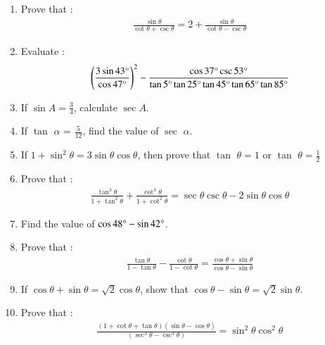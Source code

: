 \begin{enumerate}[label=\thesubsection.\arabic*.,ref=\thesubsection.\theenumi]
\hfill{}\item Prove that :
\begin{align*}
    \frac{\sin \theta}{\cot \theta + \csc \theta} = 2 + \frac{\sin \theta}{\cot \theta - \csc \theta}
\end{align*}

\hfill{}\item Evaluate :
\begin{align*}
\left(\frac{3\sin 43\degree}{\cos 47\degree}\right)^2 - \frac{\cos 37\degree \csc 53\degree}{\tan 5\degree \tan 25\degree \tan 45\degree \tan 65\degree \tan 85\degree}
\end{align*}


 \hfill{}\item If $\sin A = \frac{3}{4}$, calculate $\sec A$.


\hfill{}\item If $\tan$ $\alpha$ = ${\frac {5}{12}}$, find the value of $\sec$ $\alpha$.
\hfill{}
\item If $1 + \sin^2 \theta  = 3 \sin \theta \cos \theta$, then prove that $\tan$ $\theta = 1 $ or $\tan$ $\theta = \frac{1}{2}$

\hfill{}\item Prove that :
\begin{align*}
\frac{\tan^3 \theta}{1+\tan^2 \theta} + \frac{\cot^3 \theta}{1 + \cot^2 \theta} =  \sec \theta  \csc  \theta - 2 \sin \theta \cos \theta  
\end{align*}


\hfill{}
\item Find the value of $\cos {48\degree} - \sin {42\degree}$.

\hfill{}\item Prove that :
\begin{align*}
   {\frac{\tan\theta}{1-\tan\theta}} - {\frac{\cot\theta}{1-\cot\theta}}={\frac{\cos\theta+ \sin\theta}{\cos\theta-\sin\theta}}
\end{align*} 

\hfill{}\item If ${\cos\theta + \sin\theta} = {\sqrt 2}{\cos\theta}$, show that ${\cos\theta - \sin\theta} = {\sqrt 2}{\sin\theta}$.

\hfill{}\item Prove that :
\begin{align*}
    {\frac{(1+\cot\theta+\tan\theta)(\sin\theta-\cos\theta)}{(\sec^3\theta-\csc^3\theta)}} = \sin^2\theta \cos^2\theta
\end{align*}


\end{enumerate}

